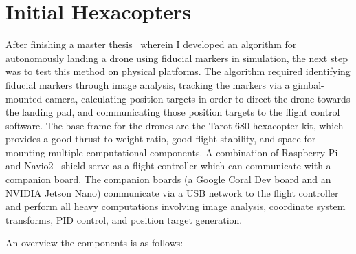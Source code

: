 \section{Initial Hexacopters}

After finishing a master thesis~\cite{joshua_master_thesis} wherein I developed an algorithm for autonomously landing a drone using
fiducial markers in simulation, the next step was to test this method on physical platforms.
The algorithm required identifying fiducial markers through image analysis,
tracking the markers via a gimbal-mounted camera,
calculating position targets in order to direct the drone towards the landing pad,
and communicating those position targets to the flight control software.
The base frame for the drones are the Tarot 680 hexacopter kit, which provides a good thrust-to-weight ratio,
good flight stability,
and space for mounting multiple computational components.
A combination of Raspberry Pi and Navio2~\cite{navio2_website} shield serve as a flight controller
which can communicate with a companion board.
The companion boards (a Google Coral Dev board and an NVIDIA Jetson Nano) communicate via a USB network to the flight
controller and perform all heavy computations involving image analysis, coordinate system transforms, PID control,
and position target generation.

An overview the components is as follows:


